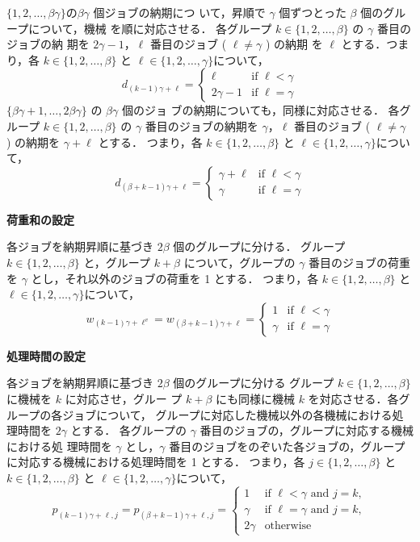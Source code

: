 \documentclass[12pt]{optlab-bachelor}
\begin{document}
$\{1,2,\ldots, \beta \gamma\}$$ の $$\beta \gamma$ 個ジョブの納期につ
いて，昇順で $\gamma$ 個ずつとった $\beta$ 個のグループについて，機械
を順に対応させる．
各グループ $k \in \{1,2,\ldots, \beta\}$ の $\gamma$ 番目のジョブの納
期を $2\gamma - 1$，$\ell$ 番目のジョブ ( $\ell \neq \gamma$ ) の納期
を $\ell$ とする．つまり，各 $k \in \{1,2,\ldots, \beta\}$ と $\ell \in \{1,2,\ldots,
\gamma\}$について，
$$d_{(k - 1)\gamma + \ell} = \left\{ \begin{array}{ll} \ell & \text{if } \ell < \gamma \\ 2\gamma - 1 & \text{if } \ell = \gamma \end{array} \right.$$
$\{\beta \gamma + 1,\ldots, 2\beta \gamma\}$ の $\beta \gamma$ 個のジョ
ブの納期についても，同様に対応させる．
各グループ $k \in \{1,2,\ldots, \beta\}$ の $\gamma$ 番目のジョブの納期を $\gamma$，$\ell$ 番目のジョブ ( $\ell \neq \gamma$ ) の納期を $\gamma + \ell$ とする．
つまり，各 $k \in \{1,2,\ldots, \beta\}$ と $\ell \in \{1,2,\ldots,
\gamma\}$について，
$$d_{(\beta + k - 1)\gamma + \ell} = \left\{ \begin{array}{ll}\gamma +  \ell & \text{if } \ell < \gamma \\ \gamma & \text{if } \ell = \gamma \end{array} \right.$$

\noindent \textbf{荷重和の設定}

各ジョブを納期昇順に基づき $2\beta$ 個のグループに分ける．
グループ $k \in \{1,2,\ldots,\beta\}$ と，グループ $k + \beta$ について，グループの $\gamma$ 番目のジョブの荷重を $\gamma$ とし，それ以外のジョブの荷重を 1 とする．
つまり，各 $k \in \{1,2,\ldots, \beta\}$ と $\ell \in \{1,2,\ldots,
\gamma\}$について，
$$w_{(k - 1)\gamma + \ell^v} = w_{(\beta + k - 1)\gamma + \ell} = \left\{ \begin{array}{ll} 1 & \text{if } \ell < \gamma \\ \gamma & \text{if } \ell = \gamma \end{array} \right.$$

\noindent \textbf{処理時間の設定}

各ジョブを納期昇順に基づき $2\beta$ 個のグループに分ける
グループ $k \in \{1,2,\ldots,\beta\}$ に機械を $k$ に対応させ，グルー
プ $k + \beta$ にも同様に機械 $k$ を対応させる．各グループの各ジョブについて， グループに対応した機械以外の各機械における処理時間を $2\gamma$ とする．
各グループの $\gamma$ 番目のジョブの，グループに対応する機械における処
理時間を $\gamma$ とし，$\gamma$ 番目のジョブをのぞいた各ジョブの，グループに対応する機械における処理時間を 1 とする．
つまり，各 $j \in \{1,2,\ldots, \beta\}$ と $k \in \{1,2,\ldots,
\beta\}$ と $\ell \in \{1,2,\ldots, \gamma\}$について，
$$p_{(k - 1)\gamma + \ell, j} = p_{(\beta + k - 1)\gamma + \ell, j} = \left\{ \begin{array}{ll} 1 & \text{if } \ell < \gamma \text{ and } j = k, \\ \gamma & \text{if } \ell = \gamma \text{ and } j = k, \\ 2\gamma & \text{otherwise}\end{array} \right.$$
\end{document}

